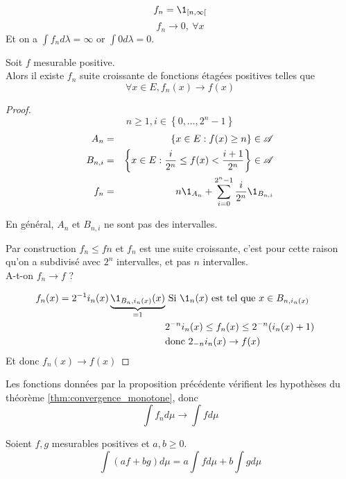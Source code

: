 \begin{example}
    $$f_n = \1_{[n, \infty[}$$
    $$f_n \to 0, \ \forall x$$
	Et on a  $\int f_n d\lambda = \infty$ or $\int 0 d\lambda = 0$.
\end{example}

\begin{prop}
	Soit $f$ mesurable positive.\\
	Alors il existe $f_n$ suite croissante de fonctions étagées positives telles que
	$$\forall x \in E, f_n(x) \to f(x)$$
\end{prop}


\begin{proof} %
	$$n \geq 1, i \in \left\{0, \dots, 2^n - 1\right\}$$
	\begin{eqnarray*}
		A_{n} &=& \left\{ x \in E : f(x) \geq n \right\} \in \triA \\
		B_{n,i} &=& \left\{ x \in E : \frac{i}{2^n} \leq f(x) < \frac{i+1}{2^n} \right\} \in \triA \\
		f_n & = & n \1_{A_n} + \sum_{i=0}^{2^n - 1} \frac{i}{2^n} \1_{B_{n,i}}
	\end{eqnarray*}

	En général, $A_n$ et $B_{n,i}$ ne sont pas des intervalles.

	Par construction $f_n \leq fn$ et $f_n$ est une suite croissante, c'est pour cette raison qu'on a subdivisé avec $2^n$ intervalles, et pas $n$ intervalles.\\
	A-t-on $f_n \to f$ ?

	\begin{eqnarray*}
		f_n(x) =  2^{-1} i_n(x)\underbrace{\1_{B_n,i_n(x)}(x)}_{=1} &\text{ Si } \1_n(x) \text{ est tel que } x \in B_{n,i_n(x)} & \\
		& 2^{-n}i_n(x) \leq f_n(x) \leq 2^{-n}(i_n(x) + 1) &\\
		& \text{donc } 2_{-n}i_n(x) \to f(x) &
	\end{eqnarray*}
	Et donc $f_n(x) \to f(x)$
\end{proof}

\begin{remarque}
	Les fonctions données par la proposition précédente vérifient les hypothèses du théorème \ref{thm:convergence_monotone}, donc
	$$ \int f_n d\mu \to \int f d\mu $$
\end{remarque}


\begin{prop}[Linéarité]
	Soient $f,g$ mesurables positives et $a, b\geq 0$.
	$$ \int (af + bg) d\mu = a\int f d\mu + b\int g d\mu $$
\end{prop}


